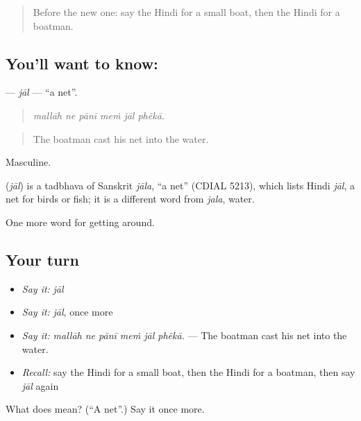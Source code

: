 \begin{quote}
Before the new one: say the Hindi for a small boat, then the Hindi for a boatman.
\end{quote}

\subsection*{You'll want to know: }
\textbf{} — \emph{jāl} — \textquotedblleft{}a net\textquotedblright{}.

\begin{quote}
     
\end{quote}

\begin{quote}
\emph{mallāh ne pānī meṁ jāl phẽkā.}
\end{quote}

\begin{quote}
The boatman cast his net into the water.
\end{quote}

Masculine.

\begin{cousinweb}
\textbf{} (\emph{jāl}) is a tadbhava of Sanskrit \emph{jāla}, \textquotedblleft{}a net\textquotedblright{} (CDIAL 5213), which lists Hindi \emph{jāl}, a net for birds or fish; it is a different word from \emph{jala}, water.
\end{cousinweb}

\begin{grammarlens}[title={What you've built}]
One more word for getting around.
\end{grammarlens}

\subsection*{Your turn}
\begin{itemize}
\raggedright
  \item \emph{Say it:} \emph{jāl}
  \item \emph{Say it:} \emph{jāl}, once more
  \item \emph{Say it:} \emph{mallāh ne pānī meṁ jāl phẽkā.} — The boatman cast his net into the water.
  \item \emph{Recall:} say the Hindi for a small boat, then the Hindi for a boatman, then say \emph{jāl} again
\end{itemize}

\begin{tcolorbox}[breakable,colback=teal!4,colframe=teal!35!black,title={Before you move on}]
What does  mean? (\textquotedblleft{}A net\textquotedblright{}.) Say it once more.
\end{tcolorbox}
